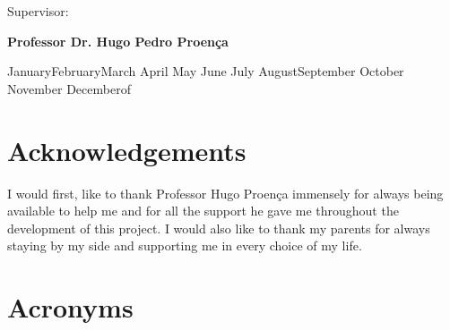 \documentclass[12pt,a4paper,oneside]{memoir}
\renewcommand{\today}{\day \ifcase \month \or January\or February\or March\or %
April \or May \or June \or July \or August\or September \or October \or November\or %
December\fi of \number \year}
\begin{document}
\vspace{0,5cm}
\begin{center}
\begin{normalsize}
\begin{large}
Supervisor:
\end{large}
\end{normalsize}
\end{center}

\vspace{0.2cm}
\begin{center}
\begin{large}
\textbf{Professor Dr. Hugo Pedro Proença}
\end{large}
\end{center}



\vspace{0.5cm}
\begin{center}
\begin{normalsize}
\today
\end{normalsize}
\end{center}


\clearpage{\thispagestyle{empty}\cleardoublepage}

\frontmatter

\chapter*{Acknowledgements}
\label{chap:ack}

I would first, like to thank Professor Hugo Proença immensely for always being available to help me and for all the support he gave me throughout the development of this project. I would also like to thank my parents for always staying by my side and supporting me in every choice of my life.

\clearpage{\thispagestyle{empty}\cleardoublepage}


\tableofcontents

\clearpage{\thispagestyle{empty}\cleardoublepage}

\listoffigures

\listoftables


\clearpage{\thispagestyle{empty}\cleardoublepage}
\chapter*{Acronyms}
\label{chap:acro}
\end{document}
